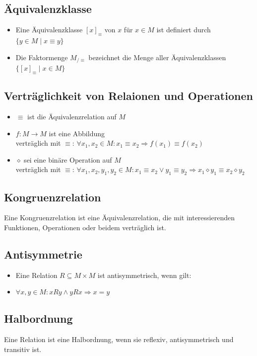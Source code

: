 \documentclass[a4paper,portrait]{scrartcl}
\begin{document}
\subsection{Äquivalenzklasse}
\begin{itemize}
\item Eine Äquivalenzklasse $[x]_\equiv $ von $x$ für $x \in M$ ist definiert durch \\
$ \lbrace y \in M \mid x \equiv y \rbrace $
\item Die Faktormenge $ M_{/ \equiv} $ bezeichnet die Menge aller Äquivalenzklassen \\
$ \lbrace [x]_{\equiv} \mid x \in M \rbrace $
\end{itemize}
\subsection{Verträglichkeit von Relaionen und Operationen}
\begin{itemize}
\item $ \equiv $ ist die Äquivalenzrelation auf $ M $
\item $ f: M \rightarrow M $ ist eine Abbildung \\
verträglich mit $ \equiv $: $ \forall x_{1}, x_{2} \in M: x_{1} \equiv x_{2} \Rightarrow f(x_{1}) \equiv f(x_{2}) $
\item $\diamond$ sei eine binäre Operation auf $M$ \\
verträglich mit $ \equiv $: $ \forall x_{1}, x_{2}, y_{1}, y_{2} \in M: x_{1} \equiv x_{2} \vee y_{1} \equiv y_{2} \Rightarrow x_{1} \diamond y_{1} \equiv x_{2} \diamond y_{2} $
\end{itemize}
\subsection{Kongruenzrelation}
Eine Kongruenzrelation ist eine Äquivalenzrelation, die mit  interessierenden Funktionen, Operationen oder beidem verträglich ist.
\subsection{Antisymmetrie}
\begin{itemize}
\item Eine Relation $ R \subseteq M \times M $ ist antisymmetrisch, wenn gilt:
\item $ \forall x,y \in M: xRy \wedge yRx \Rightarrow x = y $
\end{itemize}
\subsection{Halbordnung}
Eine Relation ist eine Halbordnung, wenn sie reflexiv, antisymmetrisch und transitiv ist.
\end{document}

